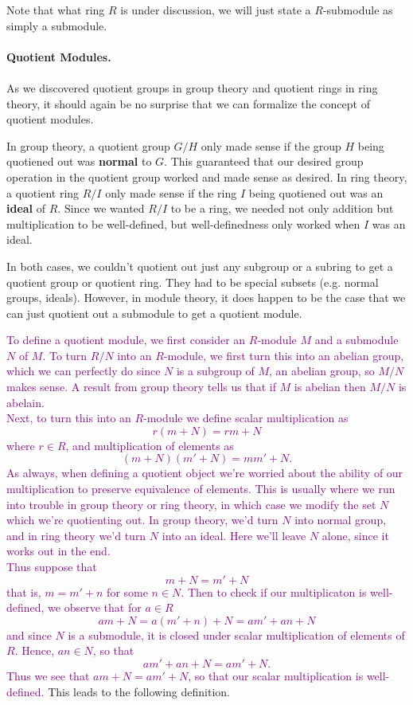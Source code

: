 \documentclass[12pt,letterpaper]{algebra_book}
\theoremstyle{definition}
\begin{document}
Note that what ring $R$ is under discussion, we will
just state a $R$-submodule as simply a submodule.
\\
\\
\textbf{Quotient Modules.}
\\
\\
As we discovered quotient groups in group theory and quotient
rings in ring theory, it should again be no surprise that we can
formalize the concept of quotient modules. 

In group theory, a quotient group $G/H$ only made sense if the
group $H$
being quotiened out was \textbf{normal} to $G$. This
guaranteed that our desired group operation in the quotient group
worked and made sense as desired. In ring theory, a quotient ring
$R/I$ only made
sense if the ring $I$ being quotiened out was an \textbf{ideal} of
$R$. Since we wanted $R/I$ to be a ring, we needed not only
addition but multiplication to be well-defined, but
well-definedness only worked when $I$ was an ideal. 

In both cases, we couldn't quotient out just any subgroup or a
subring to get a quotient group or quotient ring. They had to be
special subsets (e.g. normal groups, ideals). 
However, in
module theory, it does happen to be the case that we can just
quotient out a submodule to get a quotient module. 

\textcolor{purple}{
To define a quotient module, we first consider an $R$-module $M$
and a submodule $N$ of $M$. To turn $R/N$ into an $R$-module, we
first turn this into an abelian group, which we can perfectly do
since $N$ is a subgroup of $M$, an abelian group, so $M/N$ makes
sense. A result from group theory tells us that if $M$ is abelian
then $M/N$ is abelain. 
\\
\indent Next, to turn this into an $R$-module we define scalar
multiplication as 
\[
    r(m + N) = rm + N
\]
where $r \in R$, and multiplication of elements as
\[
    (m + N)(m' + N) = mm' + N.   
\]
As always, when defining a quotient object we're
worried about the ability of our multiplication to preserve
equivalence of elements. This is usually where we run into trouble
in group theory or ring theory, in which case we modify the set
$N$ which we're quotienting out. In group theory, we'd turn $N$ into
normal group, and in ring theory we'd turn $N$ into an ideal. Here
we'll leave $N$ alone, since it works out in the end.
\\
\indent Thus 
suppose that
\[
    m + N = m' + N
\]
that is, $m = m' + n$ for some $n \in N$. 
Then to check if our 
multiplicaton is well-defined, we observe that for $a \in R$
\[
    am + N = a(m' + n) + N = am' + an + N
\]
and since $N$ is a submodule, it is closed under scalar
multiplication of elements of $R$. Hence, $an \in N$, so that 
\[
    am' + an + N = am' + N.
\]
Thus we see that $am + N = am' + N$, so that our scalar
multiplication is well-defined.
}
This leads to the following definition.
\end{document}
